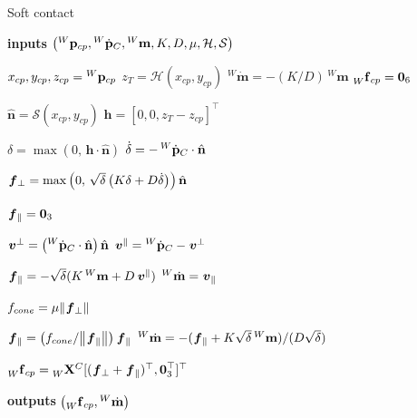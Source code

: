 \begin{algorithm}
\caption{Soft contact}
\label{algo:soft_contacts}
\begin{algorithmic}[1]
\small

\State \textbf{inputs} $\left( \pos[W]_{cp}, \posd[W]_C, {}^W \mathbf{m}, K, D, \mu, \mathcal{H}, \mathcal{S} \right)$

\State $x_{cp}, y_{cp}, z_{cp} = \pos[W]_{cp}$
\State $z_T = \mathcal{H}(x_{cp}, y_{cp})$
\State ${}^W \dot{\mathbf{m}} = -(K / D) \, {}^W \mathbf{m}$
\State $\forcesix[W]_{cp} = \zeros_6$

\State $\hat{\mathbf{n}} = \mathcal{S}(x_{cp}, y_{cp})$
\State $\mathbf{h} = \left[0, 0, z_T - z_{cp}\right]^\top$

\State $\delta = \max(0,\, \mathbf{h} \cdot \hat{\mathbf{n}})$
\State $\dot{\delta} = -\posd[W]_C \cdot \hat{\mathbf{n}}$

\State $\forcelin_\perp = \max\left(0,\, \sqrt{\delta} \left( K \delta + D \dot{\delta} \right) \right) \hat{\mathbf{n}}$

\State $\forcelin_\parallel = \zeros_3$

    \State $\vellin^\perp = \left( \posd[W]_C \cdot \hat{\mathbf{n}} \right) \hat{\mathbf{n}}$
    \State $\vellin^\parallel = \posd[W]_C - \vellin^\perp$

    \State $\forcelin_\parallel = -\sqrt{\delta}(K \, {}^W \mathbf{m} + D  \vellin^\parallel)$
    \State ${}^W \dot{\mathbf{m}} = \vellin_\parallel$

    \State $f_{cone} = \mu \norm{\forcelin_\perp}$
    
        \State $\forcelin_\parallel = \left(f_{cone} / \norm{\forcelin_\parallel}\right) \forcelin_\parallel$
        \State ${}^W \dot{\mathbf{m}} = -(\forcelin_\parallel + K \sqrt{\delta} \, {}^W \mathbf{m}) / (D \sqrt{\delta})$
    \EndIf
\EndIf

\State $\forcesix[W]_{cp} = \transfor[W]^C [(\forcelin_\perp + \forcelin_\parallel)^\top, \zeros^\top_3]^\top$

\State \textbf{outputs} $\left(\forcesix[W]_{cp}, {}^W \dot{\mathbf{m}}\right)$

\end{algorithmic}
\end{algorithm}

